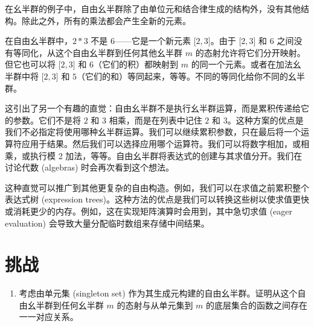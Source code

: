 \noindent
在幺半群的例子中，自由幺半群除了由单位元和结合律生成的结构外，没有其他结构。除此之外，所有的乘法都会产生全新的元素。

在自由幺半群中，$2 * 3$ 不是 $6$——它是一个新元素 ${[}2, 3{]}$。由于 ${[}2, 3{]}$ 和 $6$ 之间没有等同化，从这个自由幺半群到任何其他幺半群 $m$ 的态射允许将它们分开映射。但它也可以将 ${[}2, 3{]}$ 和 $6$（它们的积）都映射到 $m$ 的同一个元素。或者在加法幺半群中将 ${[}2, 3{]}$ 和 $5$（它们的和）等同起来，等等。不同的等同化给你不同的幺半群。

这引出了另一个有趣的直觉：自由幺半群不是执行幺半群运算，而是累积传递给它的参数。它们不是将 $2$ 和 $3$ 相乘，而是在列表中记住 $2$ 和 $3$。这种方案的优点是我们不必指定将使用哪种幺半群运算。我们可以继续累积参数，只在最后将一个运算符应用于结果。然后我们可以选择应用哪个运算符。我们可以将数字相加，或相乘，或执行模 2 加法，等等。自由幺半群将表达式的创建与其求值分开。我们在讨论代数 (algebras) 时会再次看到这个想法。

这种直觉可以推广到其他更复杂的自由构造。例如，我们可以在求值之前累积整个表达式树 (expression trees)。这种方法的优点是我们可以转换这些树以使求值更快或消耗更少的内存。例如，这在实现矩阵演算时会用到，其中急切求值 (eager evaluation) 会导致大量分配临时数组来存储中间结果。

\section{挑战}

\begin{enumerate}
  \tightlist
  \item
        考虑由单元集 (singleton set) 作为其生成元构建的自由幺半群。证明从这个自由幺半群到任何幺半群 $m$ 的态射与从单元集到 $m$ 的底层集合的函数之间存在一一对应关系。
\end{enumerate}